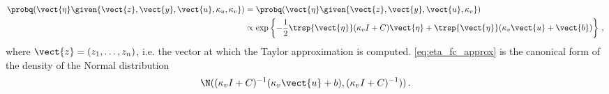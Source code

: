%
\begin{align}
\label{eq:eta_fc_approx}
    \probq(\vect{\eta} \given{\vect{z}, \vect{y}, \vect{u}, \kappa_u, \kappa_v}) &= \probq(\vect{\eta} \given{\vect{z}, \vect{y}, \vect{u}, \kappa_v}) \\
    &\propto \exp \left\{-\frac{1}{2} \trsp{\vect{\eta}} (\kappa_v I + C) \vect{\eta} + \trsp{\vect{\eta}} (\kappa_v \vect{u} + \vect{b})\right\} \, ,
\end{align}
%
where $\vect{z} = (z_1, \dots, z_n)$, i.e. the vector at which the Taylor approximation is computed. \eqref{eq:eta_fc_approx} is the canonical form of the density of the Normal distribution
%
\begin{equation*}
    \N ((\kappa_v I + C)^{-1} (\kappa_v \vect{u} + b), (\kappa_v I + C)^{-1})) \, .
\end{equation*}
